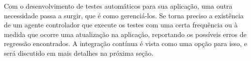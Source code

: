 Com o desenvolvimento de testes automáticos para sua aplicação, uma outra necessidade passa a surgir, que é como gerenciá-los. Se torna preciso a existência de um agente controlador que execute os testes com uma certa frequência ou à medida que ocorre uma atualização na aplicação, reportando os possíveis erros de regressão encontrados. A integração contínua é vista como uma opção para isso, e será discutido em mais detalhes na próxima seção.
